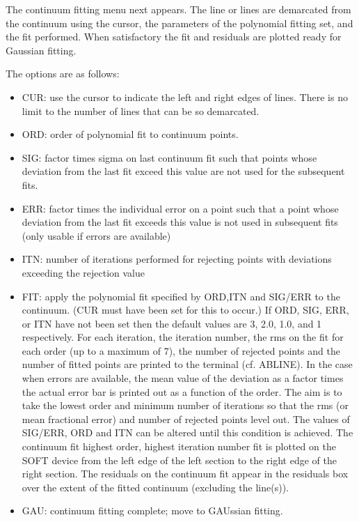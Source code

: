 The continuum fitting menu next appears. The line or lines are demarcated from
the continuum using the cursor, the parameters of the polynomial fitting set,
and the fit performed. When satisfactory the fit and residuals are plotted
ready for Gaussian fitting.

The options are as follows:

\begin{itemize}
\item CUR: use the cursor to indicate the left and right edges of lines.
   There is no limit to the number of lines that can be so demarcated.
\item ORD: order of polynomial fit to continuum points.
\item SIG: factor times sigma on last continuum fit such that points
   whose deviation from the last fit exceed this value are not used for
   the subsequent fits.
\item ERR: factor times the individual error on a point such that a
   point whose deviation from the last fit exceeds this value is not
   used in subsequent fits (only usable if errors are available)
\item ITN: number of iterations performed for rejecting points with
   deviations exceeding the rejection value
\item FIT: apply the polynomial fit specified by ORD,ITN and SIG/ERR to
   the continuum.  (CUR must have been set for this to occur.) If ORD,
   SIG, ERR, or ITN have not been set then the default values are 3,
   2.0, 1.0, and 1 respectively.  For each iteration, the iteration
   number, the rms on the fit for each order (up to a maximum of 7), the
   number of rejected points and the number of fitted points are printed
   to the terminal (cf. ABLINE). In the case when errors are available,
   the mean value of the deviation as a factor times the actual error
   bar is printed out as a function of the order. The aim is to take the
   lowest order and minimum number of iterations so that the rms (or
   mean fractional error) and number of rejected points level out. The
   values of SIG/ERR, ORD and ITN can be altered until this condition is
   achieved. The continuum fit highest order, highest iteration number
   fit is plotted on the SOFT device from the left edge of the left
   section to the right edge of the right section. The residuals on the
   continuum fit appear in the residuals box over the extent of the
   fitted continuum (excluding the line(s)).
\item GAU: continuum fitting complete; move to GAUssian fitting.
\end{itemize}

